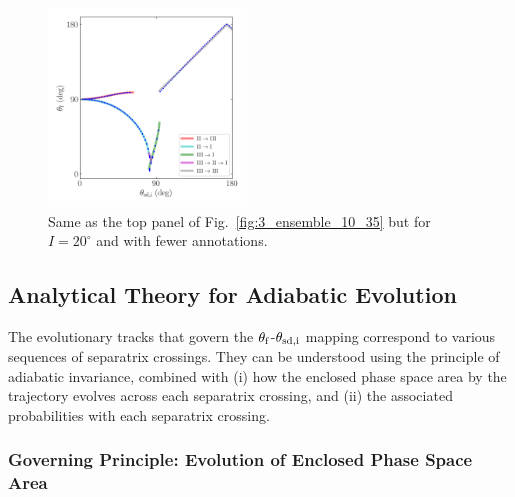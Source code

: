 \documentclass[twocolumn,twocolappendix]{aastex63}
\begin{document}
\begin{figure}
    \centering
    \includegraphics[width=0.47\textwidth]{plots_diskdisp/3_ensemble_20_35.png}
    \caption{Same as the top panel of Fig.~\ref{fig:3_ensemble_10_35} but for $I
    = 20^\circ$ and with fewer annotations.}\label{fig:3_ensemble_20_35}
\end{figure}

\subsection{Analytical Theory for Adiabatic Evolution}\label{ss:zone_transitions}

The evolutionary tracks that govern the $\theta_{\rm f}$-$\theta_{\rm sd, i}$
mapping correspond to various sequences of separatrix crossings. They can be
understood using the principle of adiabatic invariance, combined with (i) how
the enclosed phase space area by the trajectory evolves across each separatrix
crossing, and (ii) the associated probabilities with each separatrix crossing.

\subsubsection{Governing Principle: Evolution of Enclosed Phase Space
Area}\label{sss:a_evo}
\end{document}
